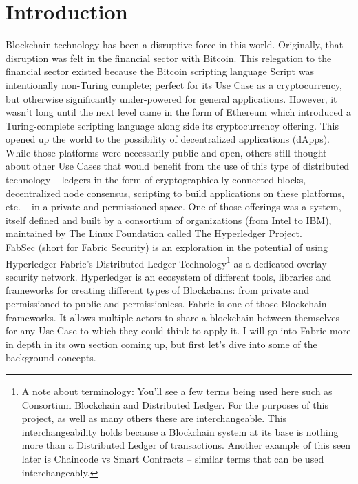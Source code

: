 \section{Introduction}
		\hspace{10mm}Blockchain technology has been a disruptive force in this world. Originally, that disruption was felt in the financial sector with Bitcoin. This relegation to the financial sector existed because the Bitcoin scripting language Script was intentionally non-Turing complete; perfect for its Use Case as a cryptocurrency, but otherwise significantly under-powered for general applications. However, it wasn't long until the next level came in the form of Ethereum which introduced a Turing-complete scripting language along side its cryptocurrency offering. This opened up the world to the possibility of decentralized applications (dApps). While those platforms were necessarily public and open, others still thought about other Use Cases that would benefit from the use of this type of distributed technology -- ledgers in the form of cryptographically connected blocks, decentralized node consensus, scripting to build applications on these platforms, etc. -- in a private and permissioned space. One of those offerings was a system, itself defined and built by a consortium of organizations (from Intel to IBM), maintained by The Linux Foundation called The Hyperledger Project.\\
	
		\hspace{10mm}FabSec (short for Fabric Security) is an exploration in the potential of using Hyperledger Fabric's Distributed Ledger Technology\footnote{A note about terminology: You'll see a few terms being used here such as Consortium Blockchain and Distributed Ledger. For the purposes of this project, as well as many others these are interchangeable. This interchangeability holds because a Blockchain system at its base is nothing more than a Distributed Ledger of transactions. Another example of this seen later is Chaincode vs Smart Contracts -- similar terms that can be used interchangeably.} as a dedicated overlay security network. Hyperledger is an ecosystem of different tools, libraries and frameworks for creating different types of Blockchains: from private and permissioned to public and permissionless. Fabric is one of those Blockchain frameworks. It allows multiple actors to share a blockchain between themselves for any Use Case to which they could think to apply it. I will go into Fabric more in depth in its own section coming up, but first let's dive into some of the background concepts.\\
		
